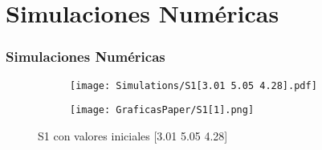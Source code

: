 \documentclass{beamer}
\begin{document}
\section{Simulaciones Num\'ericas}

\begin{frame}
	\frametitle{Simulaciones Num\'ericas}
	\begin{minipage}{10cm}
		\begin{figure}[h]
			\centering
			\begin{subfigure}[b]{0.5\textwidth}
				\centering
				\texttt{[image: Simulations/S1[3.01 5.05 4.28].pdf]}
				\label{fig:grafica1}
			\end{subfigure}%
			\begin{subfigure}[b]{0.5\textwidth}
				\centering
				\texttt{[image: GraficasPaper/S1[1].png]}
				\label{fig:grafica12}
			\end{subfigure}
			\caption{S1 con valores iniciales [3.01 5.05 4.28]}
			\label{fig:comparacion1}
		\end{figure}

	\end{minipage}
\end{frame}





\end{document}

